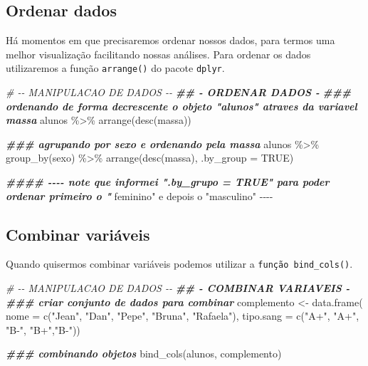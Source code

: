 \documentclass[
]{book}
\newenvironment{Shaded}{\begin{snugshade}}{\end{snugshade}}
\newcommand{\AttributeTok}[1]{\textcolor[rgb]{0.77,0.63,0.00}{#1}}
\newcommand{\CommentTok}[1]{\textcolor[rgb]{0.56,0.35,0.01}{\textit{#1}}}
\newcommand{\ConstantTok}[1]{\textcolor[rgb]{0.00,0.00,0.00}{#1}}
\newcommand{\DocumentationTok}[1]{\textcolor[rgb]{0.56,0.35,0.01}{\textbf{\textit{#1}}}}
\newcommand{\FunctionTok}[1]{\textcolor[rgb]{0.00,0.00,0.00}{#1}}
\newcommand{\NormalTok}[1]{#1}
\newcommand{\OtherTok}[1]{\textcolor[rgb]{0.56,0.35,0.01}{#1}}
\newcommand{\SpecialCharTok}[1]{\textcolor[rgb]{0.00,0.00,0.00}{#1}}
\newcommand{\StringTok}[1]{\textcolor[rgb]{0.31,0.60,0.02}{#1}}
\begin{document}
\hypertarget{ordenar-dados}{%
\subsection{Ordenar dados}\label{ordenar-dados}}

Há momentos em que precisaremos ordenar nossos dados, para termos uma melhor visualização facilitando nossas análises. Para ordenar os dados utilizaremos a função \texttt{arrange()} do pacote \texttt{dplyr}.

\begin{Shaded}
\begin{Highlighting}[]
\CommentTok{\# {-}{-} MANIPULACAO DE DADOS {-}{-}}
\DocumentationTok{\#\# {-} ORDENAR DADOS {-}}
\DocumentationTok{\#\#\# ordenando de forma decrescente o objeto "alunos" atraves da variavel massa}
\NormalTok{alunos }\SpecialCharTok{\%\textgreater{}\%}
\FunctionTok{arrange}\NormalTok{(}\FunctionTok{desc}\NormalTok{(massa))}

\DocumentationTok{\#\#\# agrupando por sexo e ordenando pela massa}
\NormalTok{alunos }\SpecialCharTok{\%\textgreater{}\%}
\FunctionTok{group\_by}\NormalTok{(sexo) }\SpecialCharTok{\%\textgreater{}\%}
\FunctionTok{arrange}\NormalTok{(}\FunctionTok{desc}\NormalTok{(massa), }\AttributeTok{.by\_group =} \ConstantTok{TRUE}\NormalTok{)}

\DocumentationTok{\#\#\#\# {-}{-}{-}{-} note que informei ".by\_grupo = TRUE" para poder ordenar primeiro o "}
\NormalTok{feminino}\StringTok{" e depois o "}\NormalTok{masculino}\StringTok{" {-}{-}{-}{-}}
\end{Highlighting}
\end{Shaded}

\hypertarget{combinar-variuxe1veis}{%
\subsection{Combinar variáveis}\label{combinar-variuxe1veis}}

Quando quisermos combinar variáveis podemos utilizar a \texttt{função\ bind\_cols()}.

\begin{Shaded}
\begin{Highlighting}[]
\CommentTok{\# {-}{-} MANIPULACAO DE DADOS {-}{-}}
\DocumentationTok{\#\# {-} COMBINAR VARIAVEIS {-}}
\DocumentationTok{\#\#\# criar conjunto de dados para combinar}
\NormalTok{complemento }\OtherTok{\textless{}{-}} \FunctionTok{data.frame}\NormalTok{(}
  \AttributeTok{nome =} \FunctionTok{c}\NormalTok{(}\StringTok{"Jean"}\NormalTok{, }\StringTok{"Dan"}\NormalTok{, }\StringTok{"Pepe"}\NormalTok{, }\StringTok{"Bruna"}\NormalTok{, }\StringTok{"Rafaela"}\NormalTok{),}
  \AttributeTok{tipo.sang =} \FunctionTok{c}\NormalTok{(}\StringTok{"A+"}\NormalTok{, }\StringTok{"A+"}\NormalTok{, }\StringTok{"B{-}"}\NormalTok{, }\StringTok{"B+"}\NormalTok{,}\StringTok{"B{-}"}\NormalTok{))}

\DocumentationTok{\#\#\# combinando objetos}
\FunctionTok{bind\_cols}\NormalTok{(alunos, complemento)}
\end{Highlighting}
\end{Shaded}
\end{document}
